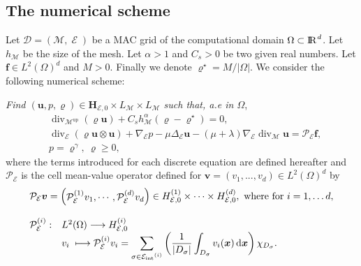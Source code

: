 \documentclass{amsart}
\numberwithin{equation}{section}
\begin{document}
\subsection{The numerical scheme}

Let  ${{\mathcal D}} = ({{\mathcal M}},\operatorname{{\mathcal{E}}}) $ be a MAC grid of the computational domain $\Omega \subset {\ifmmode{\rm	I\mkern-3.1mu
R\mkern1mu}\else{\rm I\kern-.18em 
R\hskip1pt\	}\fi\relax}^d$. Let  $h_{{\mathcal M}}$ be the size of the mesh.
Let $\alpha >1 $ and ${C_s} >0$ be two given real numbers.
Let $ \bm{f} \in L^2(\Omega)^d $ and $M>0 $. Finally we denote $ {\varrho}^\star = M/|\Omega|$. We consider the following numerical scheme:

\textit{Find $({{\boldsymbol u}},p,{\varrho}) \in  {{\mathbf{H}_{{{\mathcal E}},0}}} \times L_{{\mathcal M}} \times L_{{\mathcal M}} $ such that, a.e in $\Omega$},
\begin{subequations}\label{probdis}
\begin{align}\label{dcont} 
& \operatorname{div}_{{\mathcal M}}^\operatorname{up} ({\varrho} {{\boldsymbol u}}) + {C_s} h_{{\mathcal M}}^\alpha ( {\varrho}- {\varrho}^\star)= 0,
\\[2ex]
 & \operatorname{div}_\operatorname{{\mathcal{E}}} ({\varrho} {{\boldsymbol u}} \otimes {{\boldsymbol u}}) + \nabla_\operatorname{{\mathcal{E}}} p - \mu \Delta_\operatorname{{\mathcal{E}}} {{\boldsymbol u}} - (\mu+\lambda)\nabla_\operatorname{{\mathcal{E}}} \operatorname{div}_{{\mathcal M}} {{\boldsymbol u}} = \mathcal{P}_{{\mathcal E}}\bm{f}, \label{dmom}
  \\[2ex]
&  p = {\varrho}^\gamma, \ {\varrho} \ge 0,
\label{deos}
\end{align}
\end{subequations}
where the terms introduced for each discrete equation are defined hereafter and $\mathcal P_{{\mathcal E}}$ is the cell mean-value operator defined for $ {\bm{v}}=(v_1,...,v_d) \in L^2(\Omega)^d $ by  
\begin{align}
& \mathcal{P}_{{\mathcal E}}{{\boldsymbol v}} =\begin{pmatrix}\mathcal{P}_{{\mathcal E}}^{(1)} v_1, \cdots, \mathcal{P}_{{\mathcal E}}^{(d)} v_d \end{pmatrix} \in  H_{{{\mathcal E}},0}^{(1)}\times\cdots\times H_{{{\mathcal E}},0}^{(d)}, 
  \mbox{ where for }i= 1, \ldots d, \nonumber \\[2ex]
& \begin{matrix}                                                                                         
     \mathcal{P}_{{\mathcal E}}^{(i)}: & L^2(\Omega)\longrightarrow {H_{{{\mathcal E}},0}^{(i)}} \hfill \\
			   & \displaystyle  {v_i}\;\longmapsto \mathcal{P}^{(i)}_{{\mathcal E}}{v_i} =
			     \sum_{{{\sigma}} \in {{\mathcal E}_{\rm int}}^{(i)}} \left( \frac{1}{\vert D_{{\sigma}}\vert}\int_{D_{{\sigma}}} {v_i}({{\boldsymbol x}}) {\, {\rm d}{{\boldsymbol x}}} \right) \chi_{D_{{\sigma}}}. 
  \end{matrix}
\label{interpedges} \end{align}
\end{document}
